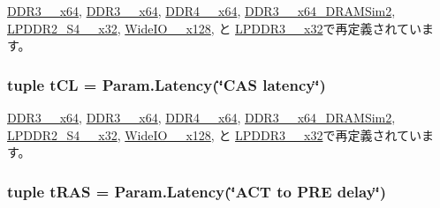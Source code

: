 \hyperlink{classDRAMCtrl_1_1DDR3__1600__x64_a78016df5bd6c91551bcf487d3d665ebe}{DDR3\_\_\-x64}, \hyperlink{classDRAMCtrl_1_1DDR3__2133__x64_a78016df5bd6c91551bcf487d3d665ebe}{DDR3\_\_\-x64}, \hyperlink{classDRAMCtrl_1_1DDR4__2400__x64_a78016df5bd6c91551bcf487d3d665ebe}{DDR4\_\_\-x64}, \hyperlink{classDRAMCtrl_1_1DDR3__1333__x64__DRAMSim2_a78016df5bd6c91551bcf487d3d665ebe}{DDR3\_\_\-x64\_\-DRAMSim2}, \hyperlink{classDRAMCtrl_1_1LPDDR2__S4__1066__x32_a78016df5bd6c91551bcf487d3d665ebe}{LPDDR2\_\-S4\_\_\-x32}, \hyperlink{classDRAMCtrl_1_1WideIO__200__x128_a78016df5bd6c91551bcf487d3d665ebe}{WideIO\_\_\-x128}, と \hyperlink{classDRAMCtrl_1_1LPDDR3__1600__x32_a78016df5bd6c91551bcf487d3d665ebe}{LPDDR3\_\_\-x32}で再定義されています。\hypertarget{classDRAMCtrl_1_1DRAMCtrl_a9bec1443ae22542fb65468589d8ef845}{
\subsubsection[{tCL}]{\setlength{\rightskip}{0pt plus 5cm}tuple {\bf tCL} = Param.Latency(\char`\"{}CAS latency\char`\"{})}}
\label{classDRAMCtrl_1_1DRAMCtrl_a9bec1443ae22542fb65468589d8ef845}


\hyperlink{classDRAMCtrl_1_1DDR3__1600__x64_a009c2614e5d317cb4805a4a98ace1b19}{DDR3\_\_\-x64}, \hyperlink{classDRAMCtrl_1_1DDR3__2133__x64_a009c2614e5d317cb4805a4a98ace1b19}{DDR3\_\_\-x64}, \hyperlink{classDRAMCtrl_1_1DDR4__2400__x64_a009c2614e5d317cb4805a4a98ace1b19}{DDR4\_\_\-x64}, \hyperlink{classDRAMCtrl_1_1DDR3__1333__x64__DRAMSim2_a009c2614e5d317cb4805a4a98ace1b19}{DDR3\_\_\-x64\_\-DRAMSim2}, \hyperlink{classDRAMCtrl_1_1LPDDR2__S4__1066__x32_a009c2614e5d317cb4805a4a98ace1b19}{LPDDR2\_\-S4\_\_\-x32}, \hyperlink{classDRAMCtrl_1_1WideIO__200__x128_a009c2614e5d317cb4805a4a98ace1b19}{WideIO\_\_\-x128}, と \hyperlink{classDRAMCtrl_1_1LPDDR3__1600__x32_a009c2614e5d317cb4805a4a98ace1b19}{LPDDR3\_\_\-x32}で再定義されています。\hypertarget{classDRAMCtrl_1_1DRAMCtrl_a1d18debfcaf49a125143125e9471c488}{
\subsubsection[{tRAS}]{\setlength{\rightskip}{0pt plus 5cm}tuple {\bf tRAS} = Param.Latency(\char`\"{}ACT to PRE delay\char`\"{})}}
\label{classDRAMCtrl_1_1DRAMCtrl_a1d18debfcaf49a125143125e9471c488}


